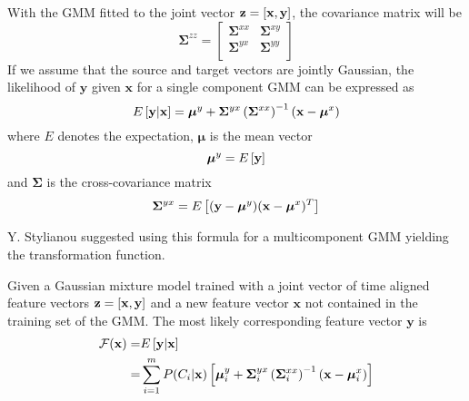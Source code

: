 With the GMM fitted to the joint vector $\mathbf{z}=\left[\mathbf{x},\mathbf{y}\right]$, the covariance matrix will be
\begin{equation}
	\mathbf{\Sigma}^{zz} = \begin{bmatrix}
		\mathbf{\Sigma}^{xx} & \mathbf{\Sigma}^{xy} \\
		\mathbf{\Sigma}^{yx} & \mathbf{\Sigma}^{yy} \\
	\end{bmatrix}
\end{equation}
If we assume that the source and target vectors are jointly Gaussian, the likelihood of $\mathbf{y}$ given $\mathbf{x}$ for a single component GMM can be expressed as \cite{kay93}
\begin{equation}
	E \left[\mathbf{y}\vert \mathbf{x}\right] = \boldsymbol{\mu}^y + \mathbf{\Sigma}^{yx} \left(\mathbf{\Sigma}^{xx}\right)^{-1} (\mathbf{x}-\boldsymbol{\mu}^x)
\end{equation}
where $E$ denotes the expectation, $\boldsymbol{\mu}$ is the mean vector
\begin{equation}
	\boldsymbol{\mu}^y = E\left[\mathbf{y}\right]
\end{equation}
and $\mathbf{\Sigma}$ is the cross-covariance matrix
\begin{equation}
	\mathbf{\Sigma}^{yx} = E \left[(\mathbf{y}-\boldsymbol{\mu}^y)(\mathbf{x}-\boldsymbol{\mu}^x)^T\right]
\end{equation}

Y. Stylianou suggested using this formula for a multicomponent GMM yielding the transformation function.
\begin{definition}
	Given a Gaussian mixture model trained with a joint vector of time aligned feature vectors $\mathbf{z} = \left[\mathbf{x},\mathbf{y}\right]$ and a new feature vector $\mathbf{x}$ not contained in the training set of the GMM. The most likely corresponding feature vector $\mathbf{y}$ is \cite{stylianou95}
	\begin{equation}
		\label{eq:transformation_function}
		\begin{split}
			\mathcal F(\mathbf{x}) =& E \left[\mathbf{y}\vert \mathbf{x}\right]\\
			=& \sum_{i=1}^{m}P(C_i \vert \mathbf{x})\left[ \boldsymbol{\mu}_i^y + \mathbf{\Sigma}_i^{yx} \left(\mathbf{\Sigma}_i^{xx}\right)^{-1} (\mathbf{x}-\boldsymbol{\mu}_i^x)\right]
		\end{split}
	\end{equation}
\end{definition}

